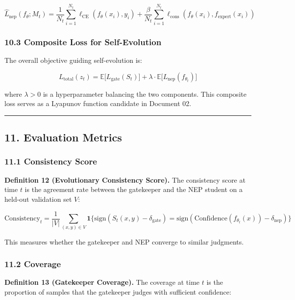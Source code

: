 \documentclass[
  12pt,
]{article}
\begin{document}
\[\hat{L}_{\text{nep}}(f_\theta; M_t) = \frac{1}{N_t} \sum_{i=1}^{N_t} \ell_{\text{CE}}(f_\theta(x_i), y_i) + \frac{\beta}{N_t} \sum_{i=1}^{N_t} \ell_{\text{cons}}(f_\theta(x_i), f_{\text{expert}}(x_i))\]

\subsubsection{10.3 Composite Loss for
Self-Evolution}\label{composite-loss-for-self-evolution}

The overall objective guiding self-evolution is:

\[L_{\text{total}}(z_t) = \mathbb{E}\bigl[ L_{\text{gate}}(S_t) \bigr] + \lambda \cdot \mathbb{E}\bigl[ L_{\text{nep}}(f_{\theta_t}) \bigr]\]

where \(\lambda > 0\) is a hyperparameter balancing the two components.
This composite loss serves as a Lyapunov function candidate in Document
02.

\begin{center}\rule{0.5\linewidth}{0.5pt}\end{center}

\subsection{11. Evaluation Metrics}\label{evaluation-metrics}

\subsubsection{11.1 Consistency Score}\label{consistency-score}

\textbf{Definition 12 (Evolutionary Consistency Score).} The consistency
score at time \(t\) is the agreement rate between the gatekeeper and the
NEP student on a held-out validation set \(V\):

\[\text{Consistency}_t = \frac{1}{|V|} \sum_{(x,y) \in V} \mathbf{1}\bigl\{ \text{sign}(S_t(x,y) - \delta_{\text{gate}}) = \text{sign}(\text{Confidence}(f_{\theta_t}(x)) - \delta_{\text{nep}}) \bigr\}\]

This measures whether the gatekeeper and NEP converge to similar
judgments.

\subsubsection{11.2 Coverage}\label{coverage}

\textbf{Definition 13 (Gatekeeper Coverage).} The coverage at time \(t\)
is the proportion of samples that the gatekeeper judges with sufficient
confidence:
\end{document}
